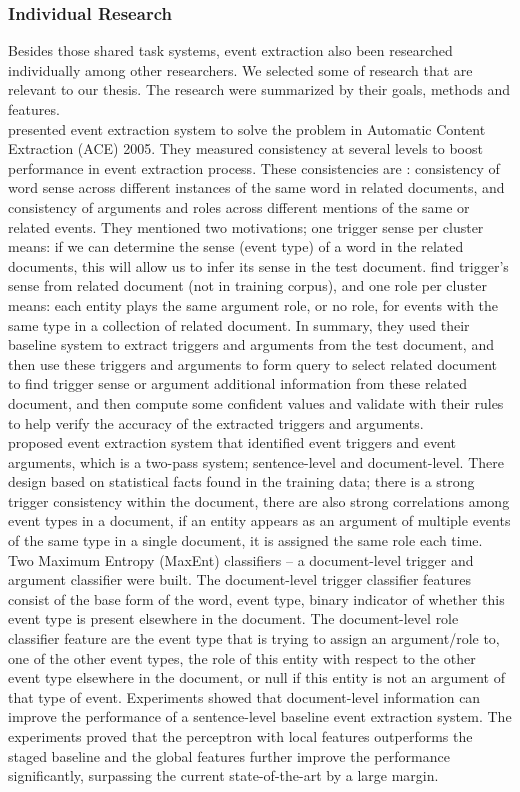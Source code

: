 \subsubsection{Individual Research}
\label{eventresearch}
Besides those shared task systems, event extraction also been researched individually among other researchers. We selected some of research that are relevant to our thesis. The research were summarized by their goals, methods and features.\\
\indent \cite{ji2008refining} presented event extraction system to solve the problem in Automatic Content Extraction (ACE) 2005. They measured consistency at several levels to boost performance in event extraction process. These consistencies are : consistency of word sense across different instances of the same word in related documents, and consistency of arguments and roles across different mentions of the same or related events. They mentioned two motivations; one trigger sense per cluster means: if we can determine the sense (event type) of a word in the related documents, this will allow us to infer its sense in the test document. find trigger’s sense from related document (not in training corpus), and one role per cluster means: each entity plays the same argument role, or no role, for events with the same type in a collection of related document. In summary, they used their baseline system to extract triggers and arguments from the test document, and then use these triggers and arguments to form query to select related document to find trigger sense or argument additional information from these related document, and then compute some confident values and validate with their rules to help verify the accuracy of the extracted triggers and arguments.\\
\indent \cite{liao2010using} proposed event extraction system that identified event triggers and event arguments, which is a two-pass system; sentence-level and document-level. There design based on statistical facts found in the training data; there is a strong trigger consistency within the document, there are also strong correlations among event types in a document, if an entity appears as an argument of multiple events of the same type in a single document, it is assigned the same role each time. Two Maximum Entropy (MaxEnt) classifiers – a document-level trigger and argument classifier were built. The document-level trigger classifier features consist of the base form of the word, event type, binary indicator of whether this event type is present elsewhere in the document. The document-level role classifier feature are the event type that is trying to assign an argument/role to, one of the other event types, the role of this entity with respect to the other event type elsewhere in the document, or null if this entity is not an argument of that type of event. Experiments showed that document-level information can improve the performance of a sentence-level baseline event extraction system. The experiments proved that the perceptron with local features outperforms the staged baseline and the global features further improve the performance signiﬁcantly, surpassing the current state-of-the-art by a large margin. \\
